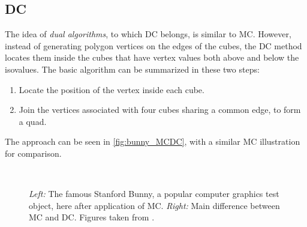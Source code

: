 \subsection{\Acl{DC}}
The idea of \emph{dual algorithms}, to which \acf{DC} belongs, is similar to \ac{MC}. However, instead of generating polygon vertices on the edges of the cubes, the \ac{DC} method locates them inside the cubes that have vertex values both above and below the isovalues. The basic algorithm can be summarized in these two steps:
\begin{enumerate}
\item Locate the position of the vertex inside each cube.
\item Join the vertices associated with four cubes sharing a common edge, to form a \ac{quad}.
\end{enumerate}
The approach can be seen in \autoref{fig:bunny_MCDC}, with a similar \ac{MC} illustration for comparison.

\begin{figure}
\centering
   \\
   \caption{\textit{Left:} The famous Stanford Bunny, a popular computer graphics test object, here after application of \ac{MC}. \textit{Right:} Main difference between \ac{MC} and \ac{DC}.  Figures taken from \cite{Hermite2002}. }
   \label{fig:bunny_MCDC}
\end{figure}

